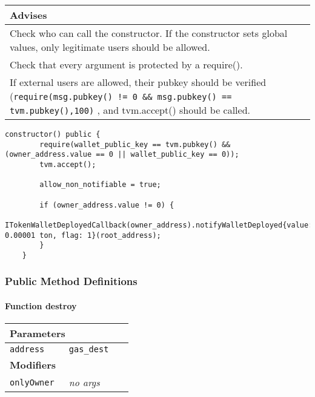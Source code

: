 
\ifsoldraft
\noindent\begin{tabular}{|p{12cm}|}\hline
\rowcolor{green}Advises
\\\hline
Check who can call the constructor. If the constructor sets global values, only legitimate users should be allowed.
\\\hline
Check that every argument is protected by a require().
\\\hline
If external users are allowed, their pubkey should be verified (\verb+require(msg.pubkey() != 0 && msg.pubkey() == tvm.pubkey(),100)+ , and tvm.accept() should be called.
\\\hline\end{tabular}
\fi
\vspace{2cm}

\begin{lstlisting}[firstnumber=43]
    constructor() public {
        require(wallet_public_key == tvm.pubkey() && (owner_address.value == 0 || wallet_public_key == 0));
        tvm.accept();

        allow_non_notifiable = true;

        if (owner_address.value != 0) {
            ITokenWalletDeployedCallback(owner_address).notifyWalletDeployed{value: 0.00001 ton, flag: 1}(root_address);
        }
    }
\end{lstlisting}

\subsubsection{Public Method Definitions}


\paragraph{Function destroy}


\ifsoltables
\noindent\begin{tabular}{|l|l|p{5cm}|}\hline
\multicolumn{3}{|l|}{\bf Parameters}\\\hline
\tt address & \tt gas\_{}dest &\\\hline
\multicolumn{3}{|l|}{\bf Modifiers}\\\hline
\tt onlyOwner & {\em no args} &\\\hline
\end{tabular}
\fi

